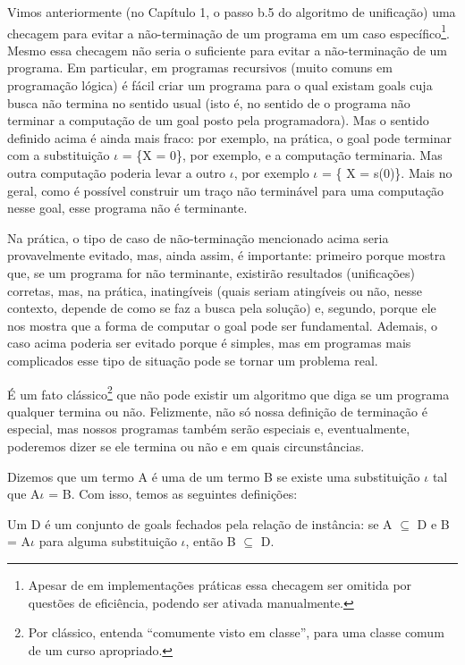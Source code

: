 \documentclass{article}
\begin{document}
Vimos anteriormente (no Capítulo 1, o passo b.5 do algoritmo de unificação) %
uma checagem para evitar a não-terminação de um programa em um caso específico\footnote{Apesar de em implementações práticas essa checagem ser omitida por questões de eficiência, podendo ser ativada manualmente.}.
Mesmo essa checagem não seria o suficiente para evitar a não-terminação de um programa.
Em particular, em programas recursivos (muito comuns em programação lógica) é fácil criar um programa para o qual existam goals cuja busca não termina no sentido usual (isto é, no sentido de o programa não terminar a computação de um goal posto pela programadora).
Mas o sentido definido acima é ainda mais fraco: por exemplo, na prática, o goal  pode terminar com a substituição $\iota$ = \{X = 0\}, por exemplo, e a computação terminaria. Mas outra computação poderia
levar a outro $\iota$, por exemplo $\iota$ = \{ X = s(0)\}. Mais no geral, como é possível construir um traço não terminável para uma computação nesse goal, esse programa não é terminante.

Na prática, o tipo de caso de não-terminação mencionado acima seria provavelmente evitado, mas, ainda assim, é importante: primeiro porque mostra que, se um programa for não terminante, existirão resultados (unificações) corretas, mas, na prática, inatingíveis (quais seriam atingíveis ou não, nesse contexto, depende de como se faz a busca pela solução) e, segundo, porque ele nos mostra que a forma de computar o goal pode ser fundamental. Ademais, o caso acima poderia ser evitado porque é simples, mas em programas mais complicados esse tipo de situação pode se tornar um problema real.

É um fato clássico\footnote{Por clássico, entenda ``comumente visto em classe'', para uma classe comum de um curso apropriado.} que não pode existir um algoritmo que diga se um programa qualquer termina ou não. Felizmente, não só nossa definição de terminação é especial, mas nossos programas também serão especiais e, eventualmente, poderemos dizer se ele termina ou não e em quais circunstâncias.

Dizemos que um termo A é uma  de um termo B se existe uma substituição $\iota$ tal que A$\iota$ = B. Com isso, temos as seguintes definições:

\begin{definition}
  Um  D é um conjunto de goals fechados pela relação de instância: se A $\subseteq$ D e B = A$\iota$ para alguma substituição $\iota$, então B $\subseteq$ D.
  \end{definition}
\end{document}
